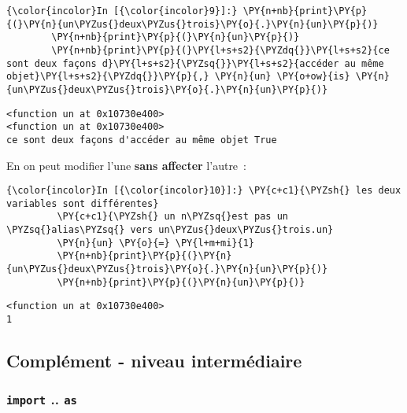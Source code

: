     \begin{Verbatim}[commandchars=\\\{\}]
{\color{incolor}In [{\color{incolor}9}]:} \PY{n+nb}{print}\PY{p}{(}\PY{n}{un\PYZus{}deux\PYZus{}trois}\PY{o}{.}\PY{n}{un}\PY{p}{)}
        \PY{n+nb}{print}\PY{p}{(}\PY{n}{un}\PY{p}{)}
        \PY{n+nb}{print}\PY{p}{(}\PY{l+s+s2}{\PYZdq{}}\PY{l+s+s2}{ce sont deux façons d}\PY{l+s+s2}{\PYZsq{}}\PY{l+s+s2}{accéder au même objet}\PY{l+s+s2}{\PYZdq{}}\PY{p}{,} \PY{n}{un} \PY{o+ow}{is} \PY{n}{un\PYZus{}deux\PYZus{}trois}\PY{o}{.}\PY{n}{un}\PY{p}{)}
\end{Verbatim}


    \begin{Verbatim}[commandchars=\\\{\}]
<function un at 0x10730e400>
<function un at 0x10730e400>
ce sont deux façons d'accéder au même objet True

    \end{Verbatim}

    En on peut modifier l'une \textbf{sans affecter} l'autre~:

    \begin{Verbatim}[commandchars=\\\{\}]
{\color{incolor}In [{\color{incolor}10}]:} \PY{c+c1}{\PYZsh{} les deux variables sont différentes}
         \PY{c+c1}{\PYZsh{} un n\PYZsq{}est pas un \PYZsq{}alias\PYZsq{} vers un\PYZus{}deux\PYZus{}trois.un}
         \PY{n}{un} \PY{o}{=} \PY{l+m+mi}{1}
         \PY{n+nb}{print}\PY{p}{(}\PY{n}{un\PYZus{}deux\PYZus{}trois}\PY{o}{.}\PY{n}{un}\PY{p}{)}
         \PY{n+nb}{print}\PY{p}{(}\PY{n}{un}\PY{p}{)}
\end{Verbatim}


    \begin{Verbatim}[commandchars=\\\{\}]
<function un at 0x10730e400>
1

    \end{Verbatim}

    \hypertarget{compluxe9ment---niveau-intermuxe9diaire}{%
\subsection{Complément - niveau
intermédiaire}\label{compluxe9ment---niveau-intermuxe9diaire}}

    \hypertarget{import-..-as}{%
\subsubsection{\texorpdfstring{\texttt{import} ..
\texttt{as}}{import .. as}}\label{import-..-as}}


